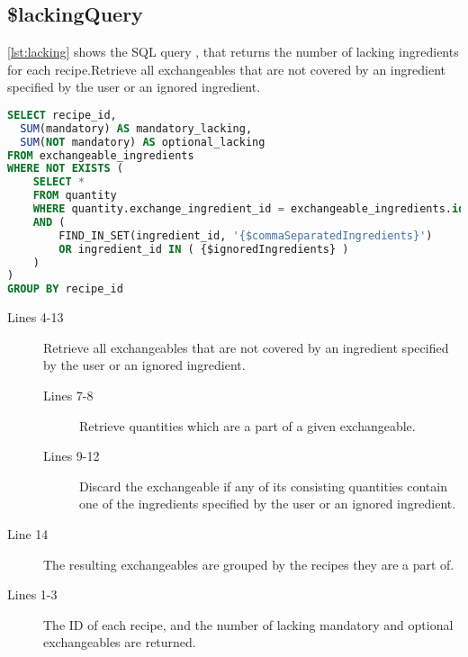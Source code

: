 \subsection*{\$lackingQuery}
\autoref{lst:lacking} shows the SQL query , that returns the number of lacking ingredients for each recipe.Retrieve all exchangeables that are not covered by an ingredient specified by the user or an ignored ingredient.
\begin{lstlisting}[language=SQL, morekeywords={IFNULL}, float=h, label={lst:lacking}, caption={\$lackingQuery, returns the number of lacking ingredients for each recipe.}]
SELECT recipe_id,
  SUM(mandatory) AS mandatory_lacking,
  SUM(NOT mandatory) AS optional_lacking
FROM exchangeable_ingredients
WHERE NOT EXISTS (
    SELECT * 
    FROM quantity
    WHERE quantity.exchange_ingredient_id = exchangeable_ingredients.id
    AND (
        FIND_IN_SET(ingredient_id, '{$commaSeparatedIngredients}')
        OR ingredient_id IN ( {$ignoredIngredients} )
    )
)
GROUP BY recipe_id
\end{lstlisting}
\begin{description}
\item[Lines 4-13] Retrieve all exchangeables that are not covered by an ingredient specified by the user or an ignored ingredient.
	\begin{description}
	\item[Lines 7-8] Retrieve quantities which are a part of a given exchangeable.
	\item[Lines 9-12] Discard the exchangeable if any of its consisting quantities contain one of the ingredients specified by the user or an ignored ingredient.
	\end{description}
\item[Line 14] The resulting exchangeables are grouped by the recipes they are a part of.
\item[Lines 1-3] The ID of each recipe, and the number of lacking mandatory and optional exchangeables are returned.
\end{description}



